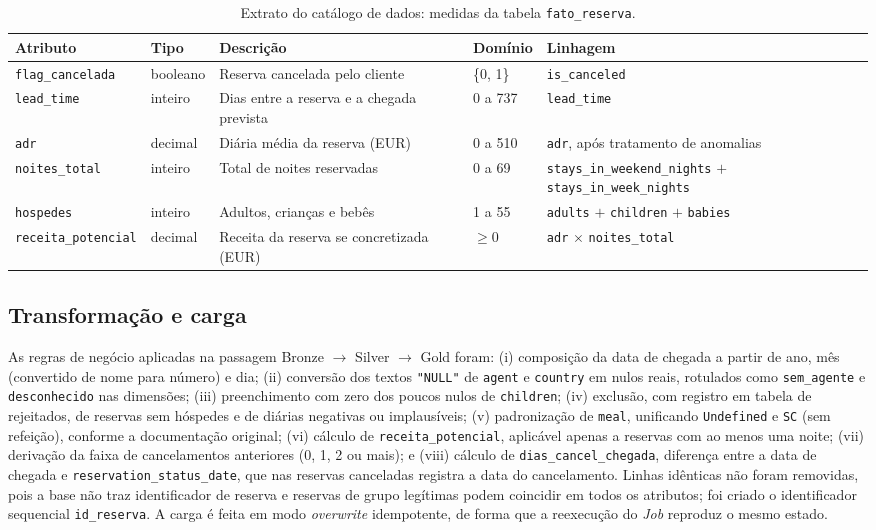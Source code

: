 \documentclass[11pt,a4paper]{article}
\begin{document}
\begin{table}[!htb]
\centering\footnotesize
\caption{Extrato do catálogo de dados: medidas da tabela \texttt{fato\_reserva}.}\label{tab:catalogo}
\begin{tabularx}{\textwidth}{@{}l l X l >{\raggedright\arraybackslash}p{4.9cm}@{}}
\toprule
\textbf{Atributo} & \textbf{Tipo} & \textbf{Descrição} & \textbf{Domínio} & \textbf{Linhagem} \\
\midrule
\texttt{flag\_cancelada} & booleano & Reserva cancelada pelo cliente & \{0, 1\} & \texttt{is\_canceled} \\
\texttt{lead\_time} & inteiro & Dias entre a reserva e a chegada prevista & 0 a 737 & \texttt{lead\_time} \\
\texttt{adr} & decimal & Diária média da reserva (EUR) & 0 a 510 & \texttt{adr}, após tratamento de anomalias \\
\texttt{noites\_total} & inteiro & Total de noites reservadas & 0 a 69 & \texttt{stays\_in\_weekend\_nights} $+$ \texttt{stays\_in\_week\_nights} \\
\texttt{hospedes} & inteiro & Adultos, crianças e bebês & 1 a 55 & \texttt{adults} $+$ \texttt{children} $+$ \texttt{babies} \\
\texttt{receita\_potencial} & decimal & Receita da reserva se concretizada (EUR) & $\geq 0$ & \texttt{adr} $\times$ \texttt{noites\_total} \\
\bottomrule
\end{tabularx}
\end{table}

\subsection{Transformação e carga}
As regras de negócio aplicadas na passagem Bronze $\rightarrow$ Silver $\rightarrow$ Gold foram: (i) composição da data de chegada a partir de ano, mês (convertido de nome para número) e dia; (ii) conversão dos textos \texttt{"NULL"} de \texttt{agent} e \texttt{country} em nulos reais, rotulados como \texttt{sem\_agente} e \texttt{desconhecido} nas dimensões; (iii) preenchimento com zero dos poucos nulos de \texttt{children}; (iv) exclusão, com registro em tabela de rejeitados, de reservas sem hóspedes e de diárias negativas ou implausíveis; (v) padronização de \texttt{meal}, unificando \texttt{Undefined} e \texttt{SC} (sem refeição), conforme a documentação original; (vi) cálculo de \texttt{receita\_potencial}, aplicável apenas a reservas com ao menos uma noite; (vii) derivação da faixa de cancelamentos anteriores (0, 1, 2 ou mais); e (viii) cálculo de \texttt{dias\_cancel\_chegada}, diferença entre a data de chegada e \texttt{reservation\_status\_date}, que nas reservas canceladas registra a data do cancelamento. Linhas idênticas não foram removidas, pois a base não traz identificador de reserva e reservas de grupo legítimas podem coincidir em todos os atributos; foi criado o identificador sequencial \texttt{id\_reserva}. A carga é feita em modo \textit{overwrite} idempotente, de forma que a reexecução do \textit{Job} reproduz o mesmo estado.
\end{document}
